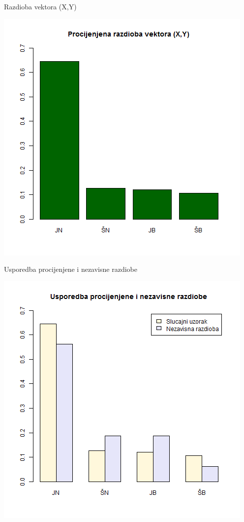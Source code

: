 \documentclass{beamer}
\begin{document}
\begin{frame}{Razdioba vektora (X,Y)}
\begin{center}
\includegraphics[scale=0.35]{1.png}\\
\end{center}
\end{frame}

\begin{frame}{Usporedba procijenjene i nezavisne razdiobe}
\begin{center}
\includegraphics[scale=0.35]{2.png}\\
\end{center}
\end{frame}
\end{document}
